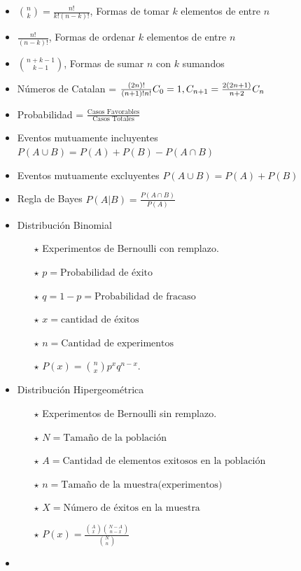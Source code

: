 \documentclass[a4paper,spanish,10pt]{article}
\begin{document}
	\begin{itemize}
		\item $\binom{n}{k} =\frac{n!}{k!(n-k)!}$, Formas de tomar $k$ elementos de entre $n$
		\item $\frac{n!}{(n-k)!}$, Formas de ordenar $k$ elementos de entre $n$
		\item $\binom{n+k-1}{k-1}$, Formas de sumar $n$ con $k$ sumandos
		\item Números de Catalan = $\frac{(2n)!}{(n+1)!n!} \\
			C_0 = 1, C_{n+1} = \frac{2(2n+1)}{n+2}C_n$
		\item Probabilidad = $\frac{\text{Casos Favorables}}{\text{Casos Totales}}$
		\item Eventos mutuamente incluyentes $P(A \cup B)=P(A)+P(B)-P(A\cap B)$
		\item Eventos mutuamente excluyentes $P(A \cup B)=P(A)+P(B)$
		\item Regla de Bayes $P(A|B)=\frac{P(A\cap B) }{P(A)}$
		\item {
			Distribuci\'on Binomial
			\begin{itemize}
				\item[$\star$] Experimentos de Bernoulli con remplazo. 
				\item[$\star$] $p=\text{Probabilidad de \'exito}$
				\item[$\star$] $q=1-p=\text{Probabilidad de fracaso}$
				\item[$\star$] $x= \text{cantidad de \'exitos}$
				\item[$\star$] $n=\text{Cantidad de experimentos}$
				\item[$\star$] $P(x)=\binom{n}{x}p^xq^{n-x}$.   
			\end{itemize}
		}
		\item{
			Distribuci\'on Hipergeom\'etrica
			\begin{itemize}
				\item[$\star$] Experimentos de Bernoulli sin remplazo. 
				\item[$\star$] $N=\text{Tama\~no de la poblaci\'on}$
				\item[$\star$] $A=\text{Cantidad de elementos exitosos en la poblaci\'on}$
				\item[$\star$] $n=\text{Tama\~no de la muestra(experimentos)}$
				\item[$\star$] $X=\text{N\'umero de \'exitos en la muestra}$
				\item[$\star$] $P(x)=\frac{\binom{A}{x}\binom{N-A}{n-x}}{\binom{N}{n}}$
			\end{itemize}
		}
		\item{
			
}
\end{itemize}
\end{document}
